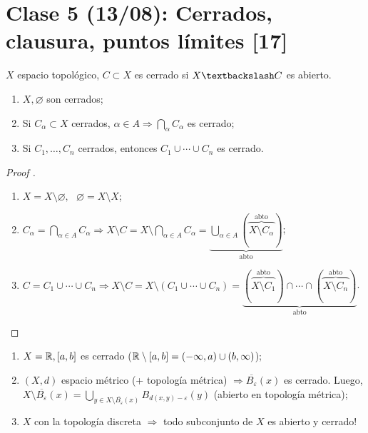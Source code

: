 
	\section{Clase 5 (13/08): Cerrados, clausura, puntos límites [17]}

	\begin{definition}
		$X$ espacio topológico, $C \subset X$ es cerrado si $X \textbackslash C$ es abierto. 
	\end{definition}

	\begin{lemma}
		\text{}
		\begin{enumerate}
			\item $X, \varnothing$ son cerrados;

			\item Si $C_{\alpha} \subset X$ cerrados, $\alpha \in A \Rightarrow \bigcap_{\alpha} C_{\alpha}$ es cerrado;

			\item Si $C_1, \dots, C_n$ cerrados, entonces $C_1 \cup \cdots \cup C_n$ es cerrado.
		\end{enumerate}
	\end{lemma}

	\begin{proof}[Proof ]
		\text{}
		\begin{enumerate}
			\item $X = X \setminus \varnothing, \text{ } \varnothing = X \setminus X$;

			\item $C_{\alpha} = \displaystyle\bigcap_{\alpha \in A} C_{\alpha} \Rightarrow X \setminus C = X \setminus \displaystyle\bigcap_{\alpha \in A} C_{\alpha} = \underbrace{\displaystyle\bigcup_{\alpha \in A} (\overbrace{X \setminus C_{\alpha}}^{\text{abto}})}_{\text{abto}}$;

			\item $C = C_1 \cup \cdots \cup C_n \Rightarrow X \setminus C = X \setminus (C_1 \cup \cdots \cup C_n) = \underbrace{(\overbrace{X \setminus C_1}^{\text{abto}}) \cap \cdots \cap (\overbrace{X \setminus C_n}^{\textrm{abto}})}_{\text{abto}}$.
		\end{enumerate}
	\end{proof}

	\begin{eg}
		\text{}
		\begin{enumerate}
			\item $X = \mathbb{R}, [a,b]$ es cerrado ($\mathbb{R} \setminus [a,b] = (-\infty, a) \cup (b, \infty)$);

			\item $(X,d)$ espacio métrico (+ topología métrica) $\Rightarrow \overline{B_{\varepsilon}} (x)$ es cerrado. Luego, $X \setminus \overline{B_{\varepsilon}} (x) = \bigcup_{y \in X \setminus \displaystyle\overline{B_{\varepsilon}} (x)} B_{d(x,y)-\varepsilon} (y)$ (abierto en topología métrica);

			\item $X$ con la topología discreta $\Rightarrow$ todo subconjunto de $X$ es abierto y cerrado!
		\end{enumerate}
	\end{eg}

